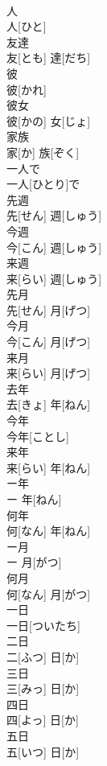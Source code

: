\documentclass[8pt]{extreport}
\begin{document}
\begin{CJK}{UTF8}{min}
\\	人	
\\	人[ひと]		
\\	友達	
\\	友[とも] 達[だち]		
\\	彼	
\\	彼[かれ]		
\\	彼女	
\\	彼[かの] 女[じょ]		
\\	家族	
\\	家[か] 族[ぞく]		
\\	一人で	
\\	一人[ひとり]で		
\\	先週	
\\	先[せん] 週[しゅう]		
\\	今週	
\\	今[こん] 週[しゅう]		
\\	来週	
\\	来[らい] 週[しゅう]		
\\	先月	
\\	先[せん] 月[げつ]		
\\	今月	
\\	今[こん] 月[げつ]		
\\	来月	
\\	来[らい] 月[げつ]		
\\	去年	
\\	去[きょ] 年[ねん]		
\\	今年	
\\	今年[ことし]		
\\	来年	
\\	来[らい] 年[ねん]		
\\	ー年	
\\	ー 年[ねん]		
\\	何年	
\\	何[なん] 年[ねん]		
\\	ー月	
\\	ー 月[がつ]		
\\	何月	
\\	何[なん] 月[がつ]		
\\	一日	
\\	一日[ついたち]		
\\	二日	
\\	二[ふつ] 日[か]		
\\	三日	
\\	三[みっ] 日[か]		
\\	四日	
\\	四[よっ] 日[か]		
\\	五日	
\\	五[いつ] 日[か]		

\end{CJK}
\end{document}
